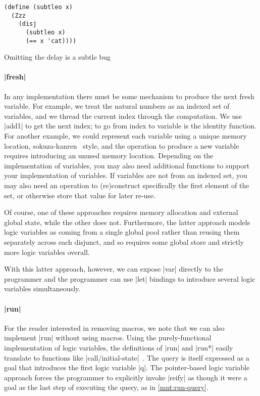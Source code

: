 \documentclass[sigplan,draft,natbib=false]{acmart}
\begin{document}
\begin{listing}
  \begin{verbatim}
(define (subtleo x)
  (Zzz
    (disj
      (subtleo x)
      (== x 'cat))))
  \end{verbatim}
  \caption{Omitting the delay is a subtle bug}
  \label{mnt:subtleo}
\end{listing}

\paragraph{\rackinline|fresh|} In any implementation there must be
some mechanism to produce the next fresh variable. For example, we
treat the natural numbers as an indexed set of variables, and we
thread the current index through the computation. We use
\rackinline|add1| to get the next index; to go from index to variable
is the identity function. For another example, we could represent each
variable using a unique memory location,
sokuza-kanren~\cite{kiselyov2006taste} style, and the operation to
produce a new variable requires introducing an unused memory location.
Depending on the implementation of variables, you may also need
additional functions to support your implementation of variables. If
variables are not from an indexed set, you may also need an operation
to (re)construct specifically the first element of the set, or
otherwise store that value for later re-use.

Of course, one of these approaches requires memory allocation and
external global state, while the other does not. Furthermore, the
latter approach models logic variables as coming from a single global
pool rather than reusing them separately across each disjunct, and so
requires some global store and strictly more logic variables overall.

With this latter approach, however, we can expose \rackinline|var|
directly to the programmer and the programmer can use \rackinline|let|
bindings to introduce several logic variables simultaneously.

\paragraph{\rackinline|run|}

For the reader interested in removing macros, we note that we can also
implement \rackinline|run| without using macros. Using the
purely-functional implementation of logic variables, the definitions
of \rackinline|run| and \rackinline|run*| easily translate to
functions like
\rackinline|call/initial-state|~\cite{hemann2013muKanren}. The query
is itself expressed as a goal that introduces the first logic variable
\rackinline|q|. The pointer-based logic variable approach forces the
programmer to explicitly invoke \rackinline|reify| as though it were a
goal as the last step of executing the query, as in
\cref{mnt:run-query}.
\end{document}
